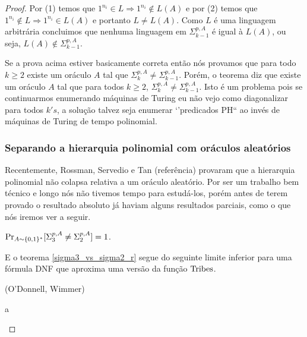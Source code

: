 \begin{proof}
Por (1) temos que $1^{n_{i}} \in L \Rightarrow 1^{n_{i}} \not\in L(A)$ e por (2) temos que $1^{n_{i}} \not\in L \Rightarrow 1^{n_{i}} \in L(A)$ e portanto $L \neq L(A)$. Como $L$ é uma linguagem arbitrária concluimos que nenhuma linguagem em $\Sigma_{k - 1}^{p, A}$ é igual à $L(A)$, ou seja, $L(A) \not\in \Sigma_{k - 1}^{p, A}$.

\color{red}

Se a prova acima estiver basicamente correta então nós provamos que para todo $k \geq 2$ existe um oráculo $A$ tal que $\Sigma_{k}^{p, A} \neq \Sigma_{k - 1}^{p, A}$. Porém, o teorema diz que existe um oráculo $A$ tal que para todos $k \geq 2$, $\Sigma_{k}^{p, A} \neq \Sigma_{k - 1}^{p, A}$. Isto é um problema pois se continuarmos enumerando máquinas de Turing eu não vejo como diagonalizar para todos $k's$, a solução talvez seja enumerar `'predicados PH`` ao invés de máquinas de Turing de tempo polinomial.

\color{black}

\subsubsection{Separando a hierarquia polinomial com oráculos aleatórios}

Recentemente, Rossman, Servedio e Tan (referência) provaram que a hierarquia polinomial não colapsa relativa a um oráculo aleatório. Por ser um trabalho bem técnico e longo nós não tivemos tempo para estudá-los, porém antes de terem provado o resultado absoluto já haviam alguns resultados parciais, como o que nós iremos ver a seguir.

\begin{teo} \label{sigma3_vs_sigma2_r}
	$\Pr_{A \sim \{0, 1\}^{*}}[\Sigma_{3}^{p, A} \neq \Sigma_{2}^{p, A}] = 1$.
\end{teo}

E o teorema \ref{sigma3_vs_sigma2_r} segue do seguinte limite inferior para uma fórmula DNF que aproxima uma versão da função $\text{Tribes}$.

\begin{teo} (O'Donnell, Wimmer)

a

\end{teo}

\end{proof}